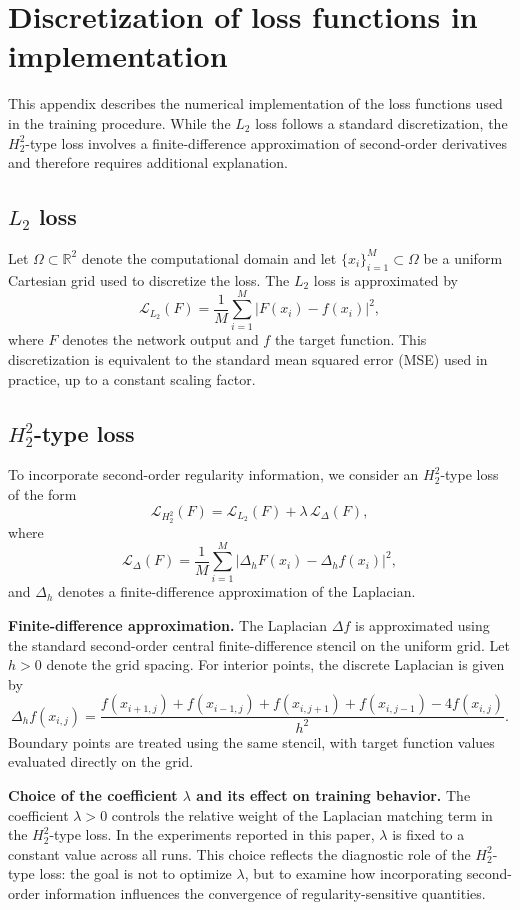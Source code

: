\documentclass[11pt,reqno]{amsart}
\numberwithin{equation}{section}
\theoremstyle{remark}
\theoremstyle{definition}
\newcommand{\emphTitle}[1]{\medskip\noindent\textbf{#1.}\quad}
\def \L {L_2}
\def \H {H^2_2}
\begin{document}
\section{Discretization of loss functions in implementation}
\label{appendix:loss discretization}

This appendix describes the numerical implementation of the loss functions used in the training procedure.
While the $\L$ loss follows a standard discretization, the $\H$-type loss involves a finite-difference approximation of second-order derivatives and therefore requires additional explanation.

\subsection{$\L$ loss}
Let $\Omega \subset \mathbb{R}^2$ denote the computational domain and let $\{x_i\}_{i=1}^M \subset \Omega$ be a uniform Cartesian grid used to discretize the loss.
The $\L$ loss is approximated by
\[
\mathcal{L}_{\L}(F)
=
\frac{1}{M}
\sum_{i=1}^M
\bigl|F(x_i) - f(x_i)\bigr|^2,
\]
where $F$ denotes the network output and $f$ the target function. This discretization is equivalent to the standard mean squared error (MSE) used in practice, up to a constant scaling factor. 

\subsection{$\H$-type loss}
To incorporate second-order regularity information, we consider an $\H$-type loss of the form
\[
\mathcal{L}_{\H}(F)
=
\mathcal{L}_{\L}(F)
+
\lambda \,
\mathcal{L}_{\Delta}(F),
\]
where
\[
\mathcal{L}_{\Delta}(F)
=
\frac{1}{M}
\sum_{i=1}^M
\bigl|
\Delta_h F(x_i) - \Delta_h f(x_i)
\bigr|^2,
\]
and $\Delta_h$ denotes a finite-difference approximation of the Laplacian.


\emphTitle{Finite-difference approximation}
The Laplacian $\Delta f$ is approximated using the standard second-order central finite-difference stencil on the uniform grid.
Let $h>0$ denote the grid spacing.
For interior points, the discrete Laplacian is given by
\[
\Delta_h f(x_{i,j})
=
\frac{
f(x_{i+1,j}) + f(x_{i-1,j}) + f(x_{i,j+1}) + f(x_{i,j-1}) - 4f(x_{i,j})
}{h^2}.
\]
Boundary points are treated using the same stencil, with target function values evaluated directly on the grid.

\emphTitle{Choice of the coefficient $\lambda$ and its effect on training behavior}
The coefficient $\lambda>0$ controls the relative weight of the Laplacian matching term in the $\H$-type loss.
In the experiments reported in this paper, $\lambda$ is fixed to a constant value across all runs.
This choice reflects the diagnostic role of the $\H$-type loss: the goal is not to optimize $\lambda$, but to examine how incorporating second-order information influences the convergence of regularity-sensitive quantities.
\end{document}
